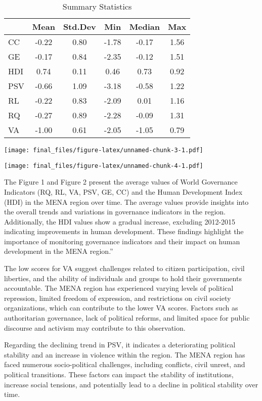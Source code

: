\documentclass[
  12pt,
]{article}
\begin{document}
\begin{table}[ht]
\centering
\caption{Summary Statistics} 
\label{tab:summary}
\begin{tabular}{lccccc}
  \toprule
 & Mean & Std.Dev & Min & Median & Max \\ 
  \midrule
CC & -0.22 & 0.80 & -1.78 & -0.17 & 1.56 \\ 
  GE & -0.17 & 0.84 & -2.35 & -0.12 & 1.51 \\ 
  HDI & 0.74 & 0.11 & 0.46 & 0.73 & 0.92 \\ 
  PSV & -0.66 & 1.09 & -3.18 & -0.58 & 1.22 \\ 
  RL & -0.22 & 0.83 & -2.09 & 0.01 & 1.16 \\ 
  RQ & -0.27 & 0.89 & -2.28 & -0.09 & 1.31 \\ 
  VA & -1.00 & 0.61 & -2.05 & -1.05 & 0.79 \\ 
   \bottomrule
\end{tabular}
\end{table}

\texttt{[image: final\_files/figure-latex/unnamed-chunk-3-1.pdf]}

\texttt{[image: final\_files/figure-latex/unnamed-chunk-4-1.pdf]}

The Figure 1 and Figure 2 present the average values of World Governance Indicators (RQ, RL, VA, PSV, GE, CC) and the Human Development Index (HDI) in the MENA region over time. The average values provide insights into the overall trends and variations in governance indicators in the region.
Additionally, the HDI values show a gradual increase, excluding 2012-2015 indicating improvements in human development. These findings highlight the importance of monitoring governance indicators and their impact on human development in the MENA region.''

The low scores for VA suggest challenges related to citizen participation, civil liberties, and the ability of individuals and groups to hold their governments accountable. The MENA region has experienced varying levels of political repression, limited freedom of expression, and restrictions on civil society organizations, which can contribute to the lower VA scores. Factors such as authoritarian governance, lack of political reforms, and limited space for public discourse and activism may contribute to this observation.

Regarding the declining trend in PSV, it indicates a deteriorating political stability and an increase in violence within the region. The MENA region has faced numerous socio-political challenges, including conflicts, civil unrest, and political transitions. These factors can impact the stability of institutions, increase social tensions, and potentially lead to a decline in political stability over time.
\end{document}
